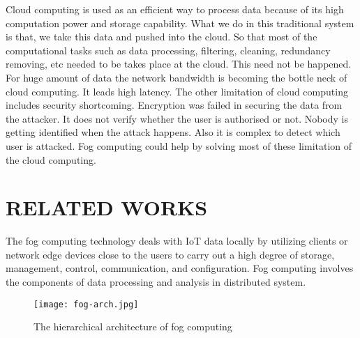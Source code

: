 \documentclass[10pt,a4paper,journal]{IEEEtran}
\begin{document}
\hspace*{2em}	Cloud computing is used as an efficient way to process data because of its high computation power and storage capability. What we do in this traditional system is that, we take this data and pushed into the cloud. So that most of the computational tasks such as data processing, filtering, cleaning, redundancy removing, etc needed to be takes place at the cloud. This need not be happened. For huge amount of data the network bandwidth is becoming the bottle neck of cloud computing. It leads high latency. The other limitation of cloud computing includes security shortcoming. Encryption was failed in securing the data from the attacker. It does not verify whether the user is authorised or not. Nobody is getting identified when the attack happens. Also it is complex to detect which user is attacked. Fog computing could help by solving most of these limitation of the cloud computing.\\

\section{RELATED WORKS}

\hspace*{1em}The fog computing technology deals with IoT data locally by utilizing clients or network edge devices close to the users to carry out a high degree of storage, management, control, communication, and configuration. Fog computing involves the components of data processing and analysis in distributed system.
       
 \begin{figure}
	\centering
	\texttt{[image: fog-arch.jpg]} 
	\caption {The hierarchical architecture of fog computing \cite{2}}
\label{Fig 1}
 \end{figure}
    
\end{document}
